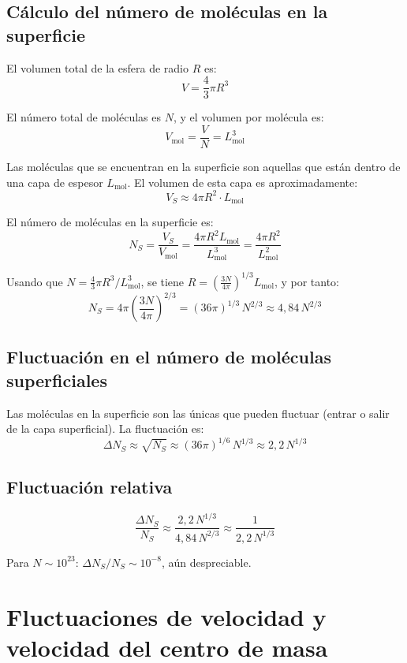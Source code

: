 \figuraMoleculasSuperficieEsfera

\subsection{Cálculo del número de moléculas en la superficie}

El volumen total de la esfera de radio $R$ es:
$$
V = \frac{4}{3}\pi R^3
$$

El número total de moléculas es $N$, y el volumen por molécula es:
$$
V_{\text{mol}} = \frac{V}{N} = L_{\text{mol}}^3
$$

Las moléculas que se encuentran en la superficie son aquellas que están dentro de una capa de espesor $L_{\text{mol}}$. El volumen de esta capa es aproximadamente:
$$
V_S \approx 4\pi R^2 \cdot L_{\text{mol}}
$$

El número de moléculas en la superficie es:
$$
N_S = \frac{V_S}{V_{\text{mol}}} = \frac{4\pi R^2 L_{\text{mol}}}{L_{\text{mol}}^3} = \frac{4\pi R^2}{L_{\text{mol}}^2}
$$

Usando que $N = \frac{4}{3}\pi R^3 / L_{\text{mol}}^3$, se tiene $R = \left(\frac{3N}{4\pi}\right)^{1/3} L_{\text{mol}}$, y por tanto:
$$
N_S = 4\pi \left(\frac{3N}{4\pi}\right)^{2/3} = (36\pi)^{1/3}\, N^{2/3} \approx 4{,}84\, N^{2/3}
$$

\subsection{Fluctuación en el número de moléculas superficiales}

Las moléculas en la superficie son las únicas que pueden fluctuar (entrar o salir de la capa superficial). La fluctuación es:
$$
\Delta N_S \approx \sqrt{N_S} \approx (36\pi)^{1/6}\, N^{1/3} \approx 2{,}2\, N^{1/3}
$$

\subsection{Fluctuación relativa}

$$
\frac{\Delta N_S}{N_S} \approx \frac{2{,}2\, N^{1/3}}{4{,}84\, N^{2/3}} \approx \frac{1}{2{,}2\, N^{1/3}}
$$

Para $N \sim 10^{23}$: $\Delta N_S / N_S \sim 10^{-8}$, aún despreciable.

\section{Fluctuaciones de velocidad y velocidad del centro de masa}

